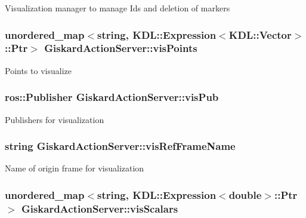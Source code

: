 Visualization manager to manage Ids and deletion of markers \hypertarget{classGiskardActionServer_a1094414df8bbfbcf469c88877f46d019}{
\subsubsection[{vis\-Points}]{\setlength{\rightskip}{0pt plus 5cm}unordered\-\_\-map$<$string, K\-D\-L\-::\-Expression$<$K\-D\-L\-::\-Vector$>$\-::Ptr$>$ Giskard\-Action\-Server\-::vis\-Points\hspace{0.3cm}{\ttfamily [private]}}}\label{classGiskardActionServer_a1094414df8bbfbcf469c88877f46d019}
Points to visualize \hypertarget{classGiskardActionServer_ad5faa562d8e3e2ea964effb5df90775b}{
\subsubsection[{vis\-Pub}]{\setlength{\rightskip}{0pt plus 5cm}ros\-::\-Publisher Giskard\-Action\-Server\-::vis\-Pub\hspace{0.3cm}{\ttfamily [private]}}}\label{classGiskardActionServer_ad5faa562d8e3e2ea964effb5df90775b}
Publishers for visualization \hypertarget{classGiskardActionServer_ab1ff77a2e75bc70378c6e763745593d1}{
\subsubsection[{vis\-Ref\-Frame\-Name}]{\setlength{\rightskip}{0pt plus 5cm}string Giskard\-Action\-Server\-::vis\-Ref\-Frame\-Name\hspace{0.3cm}{\ttfamily [protected]}}}\label{classGiskardActionServer_ab1ff77a2e75bc70378c6e763745593d1}
Name of origin frame for visualization \hypertarget{classGiskardActionServer_ae04063c56a2103232e3aa88283897666}{
\subsubsection[{vis\-Scalars}]{\setlength{\rightskip}{0pt plus 5cm}unordered\-\_\-map$<$string, K\-D\-L\-::\-Expression$<$double$>$\-::Ptr$>$ Giskard\-Action\-Server\-::vis\-Scalars\hspace{0.3cm}{\ttfamily [private]}}}\label{classGiskardActionServer_ae04063c56a2103232e3aa88283897666}
